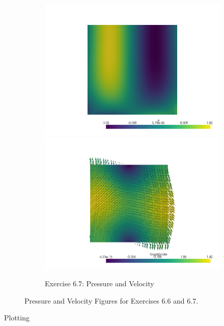 \documentclass[a4paper,12pt]{article}
\theoremstyle{exerciseStyle}
\theoremstyle{solutionStyle}
\begin{document}
\begin{figure}[htbp]
\begin{subfigure}[t]{0.48\textwidth}
        \includegraphics[width=\linewidth]{figs/pressure_67.png}
        \vspace{0.5em} %
        \includegraphics[width=\linewidth]{figs/velocity_67.png}
        \caption{Exercise 6.7: Pressure and Velocity}
        \label{fig:ex67}
    \end{subfigure}
    \caption{Pressure and Velocity Figures for Exercises 6.6 and 6.7.}
    \label{fig:combined}
\end{figure}


\FloatBarrier

Plotting

\inputminted[linenos, breaklines]{python}{plotter.py}
\end{document}
